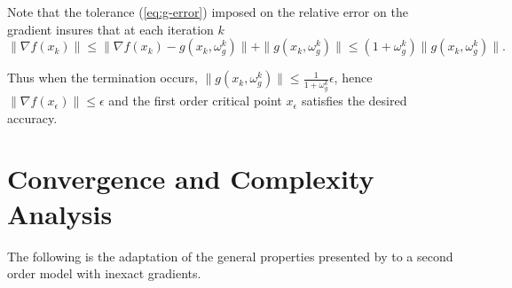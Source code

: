 \documentclass[runningheads,orivec,oribibl]{llncs}
\begin{document}
Note that the tolerance (\ref{eq:g-error}) imposed on the relative error on the gradient insures that at each iteration \(k\)
\begin{equation*}
  \|\nabla f(x_k)\| \leq \|\nabla f(x_k)-g(x_k,\omega_g^k)\| + \|g(x_k,\omega_g^k)\| \leq (1+\omega_g^k)\|g(x_k,\omega_g^k)\|.
\end{equation*}

Thus when the termination occurs,
\(\|g(x_k,\omega_g^k)\|\leq \tfrac{1}{1+\omega_g^k} \epsilon\), hence \(\|\nabla f(x_\epsilon)\|\leq \epsilon\) and the first order critical point \(x_\epsilon\) satisfies the desired accuracy.


\section{Convergence and Complexity Analysis}

\label{sec:convergence}

The following is the adaptation of the general properties presented by \cite{birgin-gardenghi-martinez-santos-toint-2017} to a second order model with inexact gradients.

%
%
%
%
%
\end{document}
